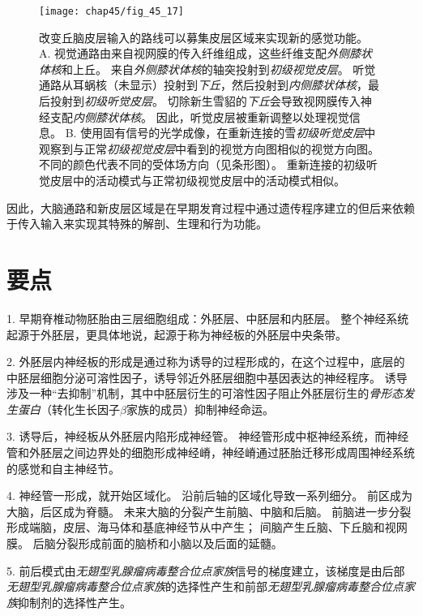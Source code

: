 \begin{figure}[htbp]
	\centering
	\texttt{[image: chap45/fig\_45\_17]}
	\caption{改变丘脑皮层输入的路线可以募集皮层区域来实现新的感觉功能\cite{sharma2000induction}。
		A. 视觉通路由来自视网膜的传入纤维组成，这些纤维支配\textit{外侧膝状体核}和上丘。
		来自\textit{外侧膝状体核}的轴突投射到\textit{初级视觉皮层}。
		听觉通路从耳蜗核（未显示）投射到\textit{下丘}，然后投射到\textit{内侧膝状体核}，最后投射到\textit{初级听觉皮层}。
		切除新生雪貂的\textit{下丘}会导致视网膜传入神经支配\textit{内侧膝状体核}。
		因此，听觉皮层被重新调整以处理视觉信息。
		B. 使用固有信号的光学成像，在重新连接的雪\textit{初级听觉皮层}中观察到与正常\textit{初级视觉皮层}中看到的视觉方向图相似的视觉方向图。
		不同的颜色代表不同的受体场方向（见条形图）。
		重新连接的初级听觉皮层中的活动模式与正常初级视觉皮层中的活动模式相似。}
	\label{fig:45_17}
\end{figure}


因此，大脑通路和新皮层区域是在早期发育过程中通过遗传程序建立的但后来依赖于传入输入来实现其特殊的解剖、生理和行为功能。



\section{要点}

1. 早期脊椎动物胚胎由三层细胞组成：外胚层、中胚层和内胚层。
整个神经系统起源于外胚层，更具体地说，起源于称为神经板的外胚层中央条带。


2. 外胚层内神经板的形成是通过称为诱导的过程形成的，在这个过程中，底层的中胚层细胞分泌可溶性因子，诱导邻近外胚层细胞中基因表达的神经程序。
诱导涉及一种“去抑制”机制，其中中胚层衍生的可溶性因子阻止外胚层衍生的\textit{骨形态发生蛋白}（转化生长因子$\beta$家族的成员）抑制神经命运。


3. 诱导后，神经板从外胚层内陷形成神经管。
神经管形成中枢神经系统，而神经管和外胚层之间边界处的细胞形成神经嵴，神经嵴通过胚胎迁移形成周围神经系统的感觉和自主神经节。


4. 神经管一形成，就开始区域化。
沿前后轴的区域化导致一系列细分。
前区成为大脑，后区成为脊髓。
未来大脑的分裂产生前脑、中脑和后脑。
前脑进一步分裂形成端脑，皮层、海马体和基底神经节从中产生；
间脑产生丘脑、下丘脑和视网膜。
后脑分裂形成前面的脑桥和小脑以及后面的延髓。


5. 前后模式由\textit{无翅型乳腺瘤病毒整合位点家族}信号的梯度建立，该梯度是由后部\textit{无翅型乳腺瘤病毒整合位点家族}的选择性产生和前部\textit{无翅型乳腺瘤病毒整合位点家族}抑制剂的选择性产生。



